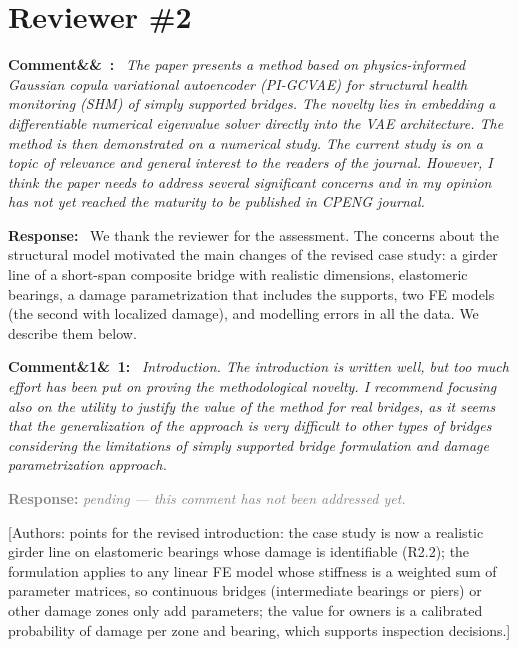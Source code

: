 \documentclass[11pt]{article}
\newenvironment{rcomment}[1]{\par\bigskip\noindent\textbf{Comment\ifx&#1&\else\ #1\fi:}\ \itshape}{\par}
\newenvironment{response}{\par\smallskip\noindent\color{resp}\textbf{Response:}\ }{\par}
\newcommand{\pending}{\par\smallskip\noindent\textcolor{gray}{\textbf{Response:} \textit{pending --- this comment
has not been addressed yet.}}\par}
\newcommand{\authornote}[1]{\textcolor{note}{\textsf{[Authors: #1]}}}
\begin{document}
\section{Reviewer \#2}

\begin{rcomment}{}
The paper presents a method based on physics-informed Gaussian copula variational autoencoder (PI-GCVAE) for
structural health monitoring (SHM) of simply supported bridges. The novelty lies in embedding a differentiable numerical
eigenvalue solver directly into the VAE architecture. The method is then demonstrated on a numerical study. The current
study is on a topic of relevance and general interest to the readers of the journal. However, I think the paper needs to
address several significant concerns and in my opinion has not yet reached the maturity to be published in CPENG
journal.
\end{rcomment}

\begin{response}
We thank the reviewer for the assessment. The concerns about the structural model motivated the main changes of the
revised case study: a girder line of a short-span composite bridge with realistic dimensions, elastomeric bearings, a
damage parametrization that includes the supports, two FE models (the second with localized damage), and modelling
errors in all the data. We describe them below.
\end{response}

\begin{rcomment}{1}
Introduction. The introduction is written well, but too much effort has been put on proving the methodological
novelty. I recommend focusing also on the utility to justify the value of the method for real bridges, as it seems that
the generalization of the approach is very difficult to other types of bridges considering the limitations of simply
supported bridge formulation and damage parametrization approach.
\end{rcomment}
\pending
\authornote{points for the revised introduction: the case study is now a realistic girder line on elastomeric bearings
whose damage is identifiable (R2.2); the formulation applies to any linear FE model whose stiffness is a weighted sum of
parameter matrices, so continuous bridges (intermediate bearings or piers) or other damage zones only add parameters;
the value for owners is a calibrated probability of damage per zone and bearing, which supports inspection
decisions.}
\end{document}
